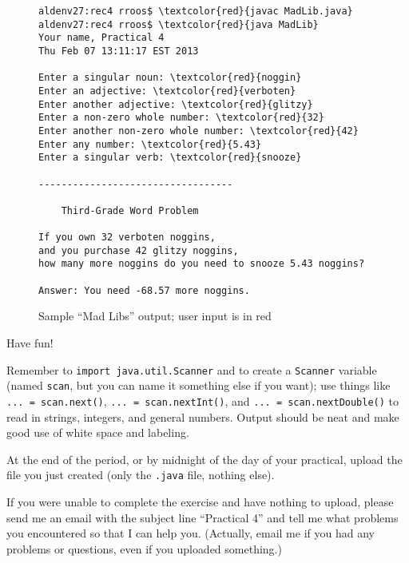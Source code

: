 \begin{figure}[htbp]
\begin{Verbatim}[commandchars=\\\{\}]
aldenv27:rec4 rroos$ \textcolor{red}{javac MadLib.java}
aldenv27:rec4 rroos$ \textcolor{red}{java MadLib}
Your name, Practical 4
Thu Feb 07 13:11:17 EST 2013

Enter a singular noun: \textcolor{red}{noggin}
Enter an adjective: \textcolor{red}{verboten}
Enter another adjective: \textcolor{red}{glitzy}
Enter a non-zero whole number: \textcolor{red}{32}
Enter another non-zero whole number: \textcolor{red}{42}
Enter any number: \textcolor{red}{5.43}
Enter a singular verb: \textcolor{red}{snooze}

----------------------------------

    Third-Grade Word Problem

If you own 32 verboten noggins,
and you purchase 42 glitzy noggins,
how many more noggins do you need to snooze 5.43 noggins?

Answer: You need -68.57 more noggins.
\end{Verbatim}
\caption{Sample ``Mad Libs'' output; user input is in red}
\label{mad}
\end{figure}

Have fun!

Remember to {\tt import java.util.Scanner} and to create a {\tt Scanner}
variable (named {\tt scan}, but you can name it something else if you want);
use things like \verb$... = scan.next()$, \verb$... = scan.nextInt()$, and
\verb$... = scan.nextDouble()$ to read in strings, integers, and general
numbers. Output should be neat and make good use of white space and
labeling.

At the end of the period, or by midnight of the day of your practical,
upload the file you just created (only the {\tt .java} file, nothing else).

If you were unable to complete the exercise and have nothing to upload,
please send me an email with the subject line ``Practical 4'' and
tell me what problems you encountered so that I can help you. (Actually,
email me if you had any problems or questions, even if you uploaded something.)


